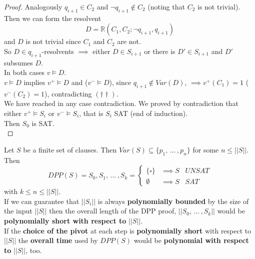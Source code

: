 \begin{proof}
	Analogously $q_{i+1} \in C_2$ and $\neg q_{i+1} \notin C_2$ (noting that $C_2$ is not trivial).\\
	
	Then we can form the resolvent
	$$ D = \mathbb{R} (C_1, C_2; \neg q_{i+1}, q_{i+1}) $$
	and $D$ is not trivial since $C_1$ and $C_2$ are not.\\
	So $D \in q_{i+1}$-resolvents $\implies$ either $D \in S_{i+1}$ or there is $D' \in S_{i+1}$ and $D'$ subsumes $D$.\\
	In both cases $v \models D$.\\
	
	$v \models D$ implies $v^+ \models D$ and ($v^- \models D$), since $q_{i+1} \notin Var(D)$, $\implies v^+ (C_1) = 1$ ($v^- (C_2) = 1$), contradicting $(\dag \dag)$.\\
	
	We have reached in any case contradiction. We proved by contradiction that either $v^+ \models S_i$ or $v^- \models S_i$, that is $S_i$ SAT (end of induction).\\
	
	Then $S_0$ is SAT.\\
\end{proof}

\newpage


\begin{remark}
	Let $S$ be a finite set of clauses. Then $Var(S) \subseteq \{p_1, \, \dots \, , p_n\}$ for some $n \leq ||S||$.\\
	Then 
	$$DPP(S) = S_0, S_1, \, \dots \, , S_k = \begin{cases}
		\{\square\}& \implies S \;\;\; UNSAT \\
		\emptyset & \implies S \;\;\; SAT
	\end{cases}
	$$
	with $k \leq n \leq ||S||$.\\
	
	If we can guarantee that $||S_i||$ is always \textbf{polynomially bounded} by the size of the input $||S||$ then the overall length of the DPP proof, $||S_0, \, \dots \, , S_k||$ would be \textbf{polynomially short with respect to} $||S||$.\\
	
	If the \textbf{choice of the pivot} at each step is \textbf{polynomially short} with respect to $||S||$ the \textbf{overall time} used by $DPP(S)$ would be \textbf{polynomial with respect to} $||S||$, too.\\
\end{remark}

